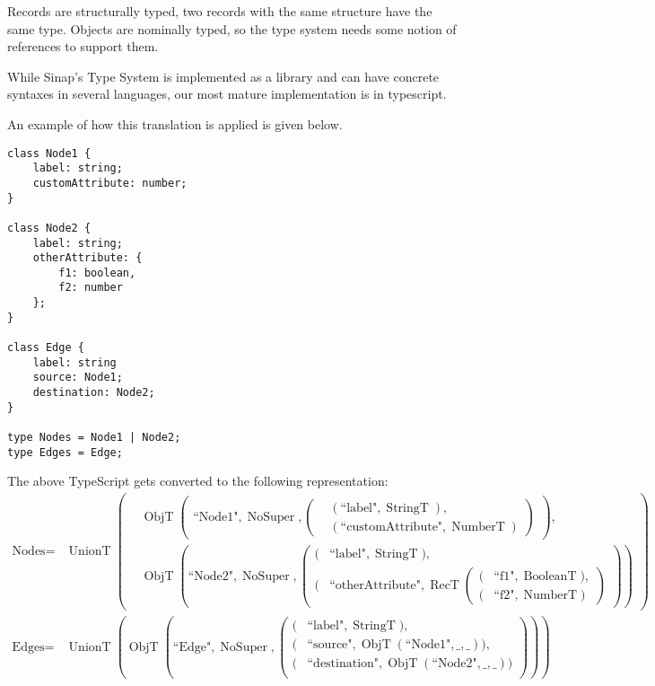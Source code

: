 \documentclass{article}
\DeclareMathOperator{\StringT}{StringT}
\DeclareMathOperator{\NumberT}{NumberT}
\DeclareMathOperator{\BooleanT}{BooleanT}
\DeclareMathOperator{\RecT}{RecT}
\DeclareMathOperator{\ObjT}{ObjT}
\DeclareMathOperator{\UnionT}{UnionT}
\DeclareMathOperator{\NoSuper}{NoSuper}
\begin{document}
Records are structurally typed, two records with the same structure have
the same type. Objects are nominally typed, so the type system needs some
notion of references to support them. 

While Sinap's Type System is implemented as a library and can have 
concrete syntaxes in several languages, our most mature implementation 
is in typescript. 

An example of how this translation is applied is given below.

\begin{verbatim}
class Node1 {
    label: string;
    customAttribute: number;
}

class Node2 {
    label: string;
    otherAttribute: {
        f1: boolean,
        f2: number
    };
}

class Edge {
    label: string
    source: Node1;
    destination: Node2;
}

type Nodes = Node1 | Node2;
type Edges = Edge;
\end{verbatim}

The above TypeScript gets converted to the following representation:
\begin{align*}
    \text{Nodes} = &\UnionT\left(
        \begin{aligned}
        &\ObjT\left(
            \begin{aligned}    
                \text{``Node1"}, \NoSuper, \left(
                    \begin{aligned}
                        &(\text{``label"}, \StringT),  \\
                        &(\text{``customAttribute"}, \NumberT)
                    \end{aligned}\right)
            \end{aligned}\right),  \\
        &\ObjT\left(\text{``Node2"}, \NoSuper, \left(\begin{aligned}
            (&\text{``label"}, \StringT),  \\
            (&\text{``otherAttribute"}, \RecT\left(
                \begin{aligned}
                    (&\text{``f1"}, \BooleanT),  \\
                    (&\text{``f2"}, \NumberT)
                \end{aligned}\right)
        \end{aligned}\right)\right)
        \end{aligned}\right)  \\
    \text{Edges} = &\UnionT\left(\ObjT\left(
        \text{``Edge"}, \NoSuper,  
        \left(\begin{aligned}
            (&\text{``label"}, \StringT), \\
            (&\text{``source"}, \ObjT(\text{``Node1"}, \_, \_)), \\
            (&\text{``destination"}, \ObjT(\text{``Node2"}, \_, \_)) \\             
        \end{aligned}\right)\right)\right)
\end{align*}
                
\end{document}
